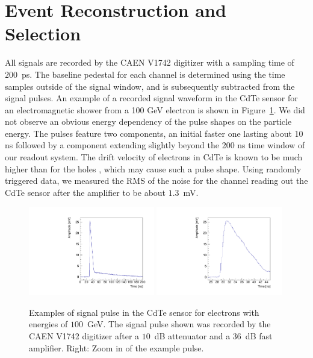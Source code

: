 
\section{Event Reconstruction and Selection }
\label{sec:reco}

All signals are recorded by the CAEN V1742 digitizer with a sampling time of $200$~ps.
The baseline pedestal for each channel is determined using the time samples outside of
the signal window, and is subsequently subtracted from the signal pulses. An example of a recorded
signal waveform in the CdTe sensor for an electromagnetic shower from a 100 GeV electron is shown 
in Figure~\ref{fig:Pulses}. We did not observe an obvious energy dependency of the pulse shapes on 
the particle energy. The pulses feature two components, an initial faster one lasting about 10 ns 
followed by a component extending slightly beyond the 200 ns time window of our readout system. 
The drift velocity of electrons in CdTe is known to be much higher than for the 
holes \cite{scpulses}, which may cause such a pulse shape.
Using randomly triggered data, we measured the RMS of the noise for the channel reading out 
the CdTe sensor after the amplifier to be about $1.3$~mV. 

\begin{figure}[htbp] 
\centering
\includegraphics[width=0.49\textwidth]{figures/CdTe_pulse.pdf}
\includegraphics[width=0.49\textwidth]{figures/CdTe_pulseZ.pdf} 
\caption{Examples of signal pulse in the CdTe sensor for electrons with energies of $100$~GeV. 
The signal pulse shown was recorded by the CAEN V1742 digitizer after a $10$~dB 
attenuator and a $36$~dB fast amplifier. Right: Zoom in of the example pulse. } 
\label{fig:Pulses} 
\end{figure} 


